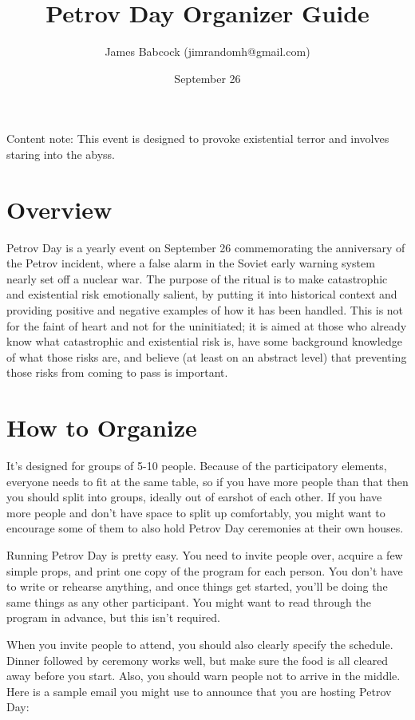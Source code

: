 \documentclass{article}
\title{Petrov Day Organizer Guide}
\author{James Babcock (jimrandomh@gmail.com)}
\date{September 26}
\begin{document}
\maketitle

Content note: This event is designed to provoke existential terror and involves
staring into the abyss.

\section{Overview}

Petrov Day is a yearly event on September 26 commemorating the anniversary of
the Petrov incident, where a false alarm in the Soviet early warning system
nearly set off a nuclear war. The purpose of the ritual is to make catastrophic
and existential risk emotionally salient, by putting it into historical context
and providing positive and negative examples of how it has been handled. This
is not for the faint of heart and not for the uninitiated; it is aimed at those
who already know what catastrophic and existential risk is, have some
background knowledge of what those risks are, and believe (at least on an
abstract level) that preventing those risks from coming to pass is important.

\section{How to Organize}

It's designed for groups of 5-10 people. Because of the participatory elements,
everyone needs to fit at the same table, so if you have more people than that
then you should split into groups, ideally out of earshot of each other. If you
have more people and don't have space to split up comfortably, you might want
to encourage some of them to also hold Petrov Day ceremonies at their own
houses.

Running Petrov Day is pretty easy. You need to invite people over, acquire a
few simple props, and print one copy of the program for each person. You don't
have to write or rehearse anything, and once things get started, you'll be
doing the same things as any other participant. You might want to read through
the program in advance, but this isn't required.

When you invite people to attend, you should also clearly specify the schedule.
Dinner followed by ceremony works well, but make sure the food is all cleared
away before you start. Also, you should warn people not to arrive in the middle.
Here is a sample email you might use to announce that you are hosting Petrov
Day:
\end{document}
